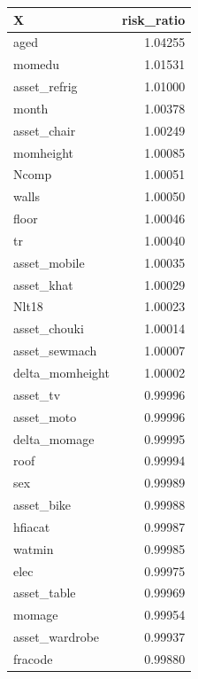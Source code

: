 \documentclass[12pt, krantz2,]{krantz}
\newenvironment{Shaded}{\begin{snugshade}}{\end{snugshade}}
\newcommand{\ControlFlowTok}[1]{\textcolor[rgb]{0.27,0.27,0.27}{\textbf{#1}}}
\newcommand{\DataTypeTok}[1]{\textcolor[rgb]{0.27,0.27,0.27}{#1}}
\newcommand{\KeywordTok}[1]{\textcolor[rgb]{0.27,0.27,0.27}{\textbf{#1}}}
\newcommand{\NormalTok}[1]{#1}
\newcommand{\OperatorTok}[1]{\textcolor[rgb]{0.43,0.43,0.43}{\textbf{#1}}}
\newcommand{\OtherTok}[1]{\textcolor[rgb]{0.37,0.37,0.37}{#1}}
\newcommand{\StringTok}[1]{\textcolor[rgb]{0.5,0.5,0.5}{#1}}
\theoremstyle{definition}
\theoremstyle{definition}
\theoremstyle{definition}
\newcommand{\1}{\mathbbm{1}}
\begin{document}
\begin{Shaded}
\end{Shaded}

\begin{tabular}{l|r}
\hline
X & risk\_ratio\\
\hline
aged & 1.04255\\
\hline
momedu & 1.01531\\
\hline
asset\_refrig & 1.01000\\
\hline
month & 1.00378\\
\hline
asset\_chair & 1.00249\\
\hline
momheight & 1.00085\\
\hline
Ncomp & 1.00051\\
\hline
walls & 1.00050\\
\hline
floor & 1.00046\\
\hline
tr & 1.00040\\
\hline
asset\_mobile & 1.00035\\
\hline
asset\_khat & 1.00029\\
\hline
Nlt18 & 1.00023\\
\hline
asset\_chouki & 1.00014\\
\hline
asset\_sewmach & 1.00007\\
\hline
delta\_momheight & 1.00002\\
\hline
asset\_tv & 0.99996\\
\hline
asset\_moto & 0.99996\\
\hline
delta\_momage & 0.99995\\
\hline
roof & 0.99994\\
\hline
sex & 0.99989\\
\hline
asset\_bike & 0.99988\\
\hline
hfiacat & 0.99987\\
\hline
watmin & 0.99985\\
\hline
elec & 0.99975\\
\hline
asset\_table & 0.99969\\
\hline
momage & 0.99954\\
\hline
asset\_wardrobe & 0.99937\\
\hline
fracode & 0.99880\\
\hline
\end{tabular}
\end{document}
